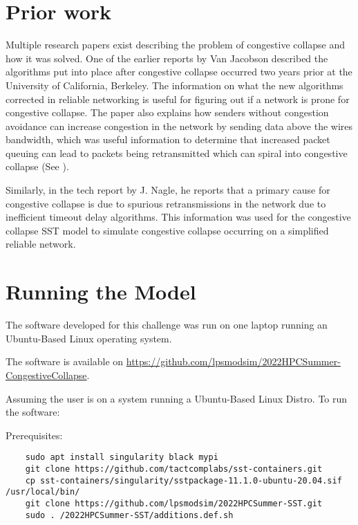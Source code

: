 \documentclass{article}
\begin{document}
\section{Prior work} %
Multiple research papers exist describing the problem of congestive collapse and how it was solved. One of the earlier reports by Van Jacobson\cite{vanjacob} described the algorithms put into place after congestive collapse occurred two years prior at the University of California, Berkeley. The information on what the new algorithms corrected in reliable networking is useful for figuring out if a network is prone for congestive collapse. The paper also explains how senders without congestion avoidance can increase congestion in the network by sending data above the wires bandwidth, which was useful information to determine that increased packet queuing can lead to packets being retransmitted which can spiral into congestive collapse (See \cite[p.325]{vanjacob}).

Similarly, in the tech report by J. Nagle\cite{RFC0896}, he reports that a primary cause for congestive collapse is due to spurious retransmissions in the network due to inefficient timeout delay algorithms. This information was used for the congestive collapse SST model to simulate congestive collapse occurring on a simplified reliable network.
\section{Running the Model}

The software developed for this challenge was run on one laptop running an Ubuntu-Based Linux operating system.

\noindent The software is available on \href{https://github.com/lpsmodsim/2022HPCSummer-CongestiveCollapse}{https://github.com/lpsmodsim/2022HPCSummer-CongestiveCollapse}.\newline

\noindent Assuming the user is on a system running a Ubuntu-Based Linux Distro. To run the software:\newline

\noindent Prerequisites: 

\begin{verbatim}
	sudo apt install singularity black mypi
	git clone https://github.com/tactcomplabs/sst-containers.git
	cp sst-containers/singularity/sstpackage-11.1.0-ubuntu-20.04.sif /usr/local/bin/
	git clone https://github.com/lpsmodsim/2022HPCSummer-SST.git
	sudo . /2022HPCSummer-SST/additions.def.sh
\end{verbatim}
\end{document}
